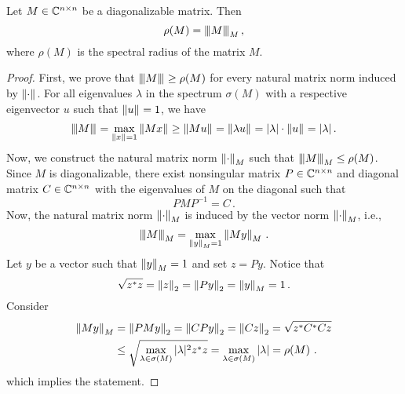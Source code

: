 \begin{thm}
\label{thm:norm}
Let $M\in\CC^{n\times n}$ be a diagonalizable matrix. Then %
$$
\rho(M)=\Mnorm{M}{M}\,,
$$
where $\rho(M)$ is the spectral radius of the matrix $M$. %
\end{thm}
\begin{proof}
First, we prove that $\Mnorm{M}{}\geq\rho(M)$ for every natural matrix norm induced by $\norm{\cdot}{}$. For all eigenvalues $\lambda$ in the spectrum $\sigma(M)$ with a respective eigenvector $u$ such that $\norm{u}{}=1$, we have
$$
\Mnorm{M}{}=\max_{\norm{x}{}=1} \norm{Mx}{}\geq \norm{Mu}{}=\norm{\lambda u}{}=|\lambda|\cdot\norm{u}{}=|\lambda|\,.
$$
Now, we construct the natural matrix norm $\norm{\cdot}{M}$ such that $\Mnorm{M}{M}\leq\rho(M)$. Since $M$ is diagonalizable, there exist nonsingular matrix $P\in\CC^{n\times n}$ and diagonal matrix $C\in\CC^{n\times n}$ with the eigenvalues of $M$ on the diagonal such that 
$$
PMP^{-1}=C\,.
$$ 
Now, the natural matrix norm $\norm{\cdot}{M}$ is induced by the vector norm $\norm{\cdot}{M}$, i.e.,
$$
\Mnorm{M}{M}=\max_{\norm{y}{M}=1} \norm{My}{M}\,.
$$
Let $y$ be a  vector such that $\norm{y}{M}=1$ and set $z=Py$. Notice that 
$$
\sqrt{z^*z}=\norm{z}{2}=\norm{Py}{2}=\norm{y}{M}=1\,.
$$
Consider
\begin{align*}
\norm{My}{M}&=\norm{PMy}{2}=\norm{CPy}{2}=\norm{Cz}{2}=\sqrt{z^*C^*Cz}\\
    &\leq \sqrt{\max_{\lambda\in\sigma(M)}|\lambda|^2 z^*z}=\max_{\lambda\in\sigma(M)}|\lambda|=\rho(M)\,\,.
\end{align*}
which implies the statement.
\end{proof}

